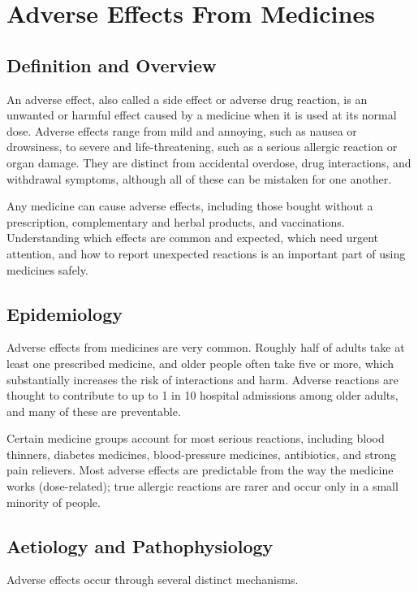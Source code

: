 \chapter{Adverse Effects From Medicines}

\section*{Definition and Overview}
An adverse effect, also called a side effect or adverse drug reaction, is an unwanted or harmful effect caused by a medicine when it is used at its normal dose. Adverse effects range from mild and annoying, such as nausea or drowsiness, to severe and life-threatening, such as a serious allergic reaction or organ damage. They are distinct from accidental overdose, drug interactions, and withdrawal symptoms, although all of these can be mistaken for one another.

Any medicine can cause adverse effects, including those bought without a prescription, complementary and herbal products, and vaccinations. Understanding which effects are common and expected, which need urgent attention, and how to report unexpected reactions is an important part of using medicines safely.

\section*{Epidemiology}
Adverse effects from medicines are very common. Roughly half of adults take at least one prescribed medicine, and older people often take five or more, which substantially increases the risk of interactions and harm. Adverse reactions are thought to contribute to up to 1 in 10 hospital admissions among older adults, and many of these are preventable.

Certain medicine groups account for most serious reactions, including blood thinners, diabetes medicines, blood-pressure medicines, antibiotics, and strong pain relievers. Most adverse effects are predictable from the way the medicine works (dose-related); true allergic reactions are rarer and occur only in a small minority of people.

\section*{Aetiology and Pathophysiology}
Adverse effects occur through several distinct mechanisms.

